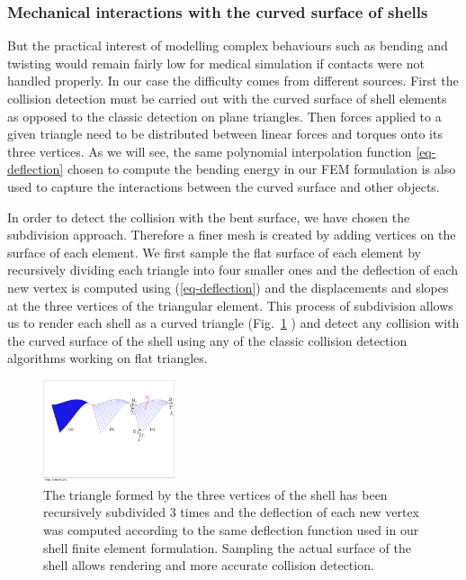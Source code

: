 \documentclass{llncs}
\begin{document}
\subsubsection{Mechanical interactions with the curved surface of shells}
\label{sec:interactions}
But the practical interest of modelling complex behaviours such as bending and twisting would remain fairly low for medical simulation if contacts were not handled properly. In our case the difficulty comes from different sources. First the collision detection must be carried out with the curved surface of shell elements as opposed to the classic detection on plane triangles. Then forces applied to a given triangle need to be distributed between linear forces and torques onto its three vertices.  As we will see, the same polynomial interpolation function \ref{eq-deflection} chosen to compute the bending energy in our FEM formulation is also used to capture the interactions between the curved surface and other objects. 

In order to detect the collision with the bent surface, we have chosen the subdivision approach. Therefore a finer mesh is created by adding vertices on the surface of each element. We first sample the flat surface of each element by recursively dividing each triangle into four smaller ones and the deflection of each new vertex is computed using (\ref{eq-deflection}) and the displacements and slopes at the three vertices of the triangular element. This process of subdivision allows us to render each shell as a curved triangle (Fig.~\ref{fig-shell} ) and detect any collision with the curved surface of the shell using any of the classic collision detection algorithms working on flat triangles.
\begin{figure}
\centering
\includegraphics[height=3cm]{images/shell_curvature}
\caption {The triangle formed by the three vertices of the shell has been recursively subdivided 3 times and the deflection of each new vertex was computed according to the same deflection function used in our shell finite element formulation. Sampling the actual surface of the shell allows rendering and more accurate collision detection.}
\label{fig-shell}
\end{figure}
\end{document}
